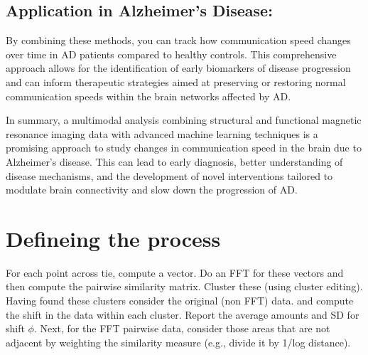 \documentclass[twocolumn]{article}
\begin{document}
\subsection{Application in Alzheimer's Disease:}

 By combining these methods, you can track how communication speed changes over time in AD patients compared to healthy controls. This comprehensive approach allows for the identification of early biomarkers of disease progression and can inform therapeutic strategies aimed at preserving or restoring normal communication speeds within the brain networks affected by AD.

In summary, a multimodal analysis combining structural and functional magnetic resonance imaging data with advanced machine learning techniques is a promising approach to study changes in communication speed in the brain due to Alzheimer's disease. This can lead to early diagnosis, better understanding of disease mechanisms, and the development of novel interventions tailored to modulate brain connectivity and slow down the progression of AD.

\section{Defineing the process}
For each point across tie, compute a vector. Do an FFT for these vectors and then compute the pairwise similarity matrix. Cluster these (using cluster editing). Having found these clusters consider the original (non FFT) data. and compute the shift in the data within each cluster. Report the average amounts and SD for shift $\phi$. Next, for the FFT pairwise data, consider those areas that are not adjacent by weighting the similarity measure (e.g., divide it by 1/log distance).

\end{document}
